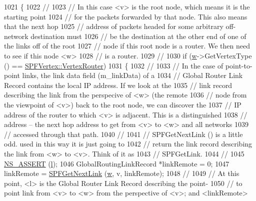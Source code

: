 \begin{DoxyCode}
1021     \{
1022 \textcolor{comment}{//}
1023 \textcolor{comment}{// In this case <v> is the root node, which means it is the starting point}
1024 \textcolor{comment}{// for the packets forwarded by that node.  This also means that the next hop}
1025 \textcolor{comment}{// address of packets headed for some arbitrary off-network destination must}
1026 \textcolor{comment}{// be the destination at the other end of one of the links off of the root}
1027 \textcolor{comment}{// node if this root node is a router.  We then need to see if this node <w>}
1028 \textcolor{comment}{// is a router.}
1029 \textcolor{comment}{//}
1030       \textcolor{keywordflow}{if} (\hyperlink{lte_2model_2fading-traces_2fading__trace__generator_8m_afd61ec66f9d7b807eece6eb12c781844}{w}->GetVertexType () == \hyperlink{classns3_1_1SPFVertex_a20f8a4cfc99a1b7ecd10a23151b93afda340822983a2833fff14de88ea20a3f31}{SPFVertex::VertexRouter}) 
1031         \{
1032 \textcolor{comment}{//}
1033 \textcolor{comment}{// In the case of point-to-point links, the link data field (m\_linkData) of a}
1034 \textcolor{comment}{// Global Router Link Record contains the local IP address.  If we look at the}
1035 \textcolor{comment}{// link record describing the link from the perspecive of <w> (the remote}
1036 \textcolor{comment}{// node from the viewpoint of <v>) back to the root node, we can discover the}
1037 \textcolor{comment}{// IP address of the router to which <v> is adjacent.  This is a distinguished}
1038 \textcolor{comment}{// address -- the next hop address to get from <v> to <w> and all networks }
1039 \textcolor{comment}{// accessed through that path.}
1040 \textcolor{comment}{//}
1041 \textcolor{comment}{// SPFGetNextLink () is a little odd.  used in this way it is just going to}
1042 \textcolor{comment}{// return the link record describing the link from <w> to <v>.  Think of it as}
1043 \textcolor{comment}{// SPFGetLink.}
1044 \textcolor{comment}{//}
1045           \hyperlink{assert_8h_a6dccdb0de9b252f60088ce281c49d052}{NS\_ASSERT} (\hyperlink{buildings__pathloss_8m_a5b54c0a045f179bcbbbc9abcb8b5cd4c}{l});
1046           GlobalRoutingLinkRecord *linkRemote = 0;
1047           linkRemote = \hyperlink{classns3_1_1GlobalRouteManagerImpl_a4c868c90e06e063ac2eb60cfe93c2c84}{SPFGetNextLink} (\hyperlink{lte_2model_2fading-traces_2fading__trace__generator_8m_afd61ec66f9d7b807eece6eb12c781844}{w}, v, linkRemote);
1048 \textcolor{comment}{// }
1049 \textcolor{comment}{// At this point, <l> is the Global Router Link Record describing the point-}
1050 \textcolor{comment}{// to point link from <v> to <w> from the perspective of <v>; and <linkRemote>}

\end{DoxyCode}
